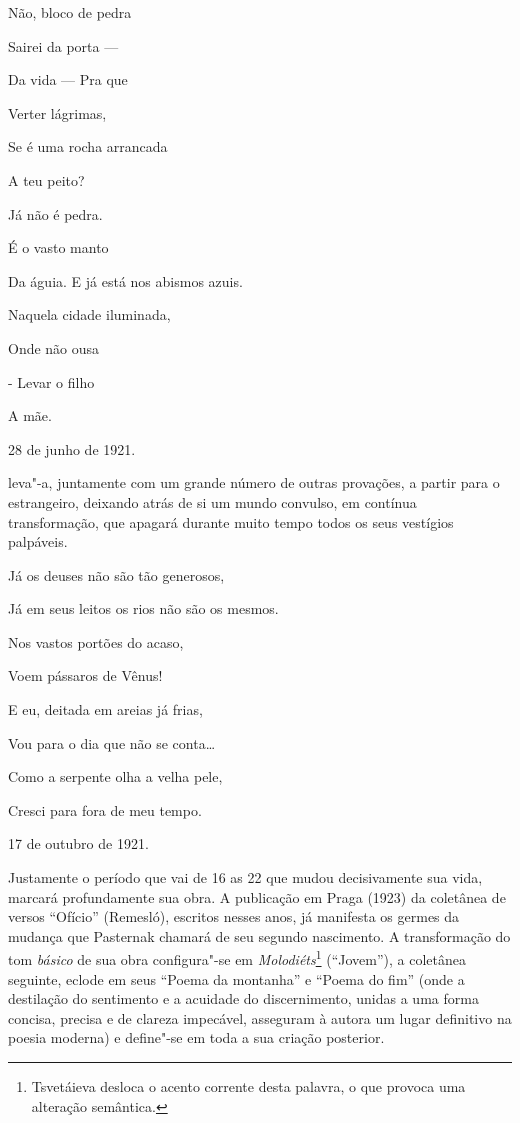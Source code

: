 Não, bloco de pedra

Sairei da porta ---

Da vida --- Pra que

Verter lágrimas,

Se é uma rocha arrancada

A teu peito?

Já não é pedra.

É o vasto manto

Da águia. E já está nos abismos azuis.

Naquela cidade iluminada,

Onde não ousa

- Levar o filho

A mãe.

28 de junho de 1921.

leva"-a, juntamente com um grande número de outras provações, a partir
para o estrangeiro, deixando atrás de si um mundo convulso, em contínua
transformação, que apagará durante muito tempo todos os seus vestígios
palpáveis.

Já os deuses não são tão generosos,

Já em seus leitos os rios não são os mesmos.

Nos vastos portões do acaso,

Voem pássaros de Vênus!

E eu, deitada em areias já frias,

Vou para o dia que não se conta\ldots{}

Como a serpente olha a velha pele,

Cresci para fora de meu tempo.

17 de outubro de 1921.

Justamente o período que vai de 16 as 22 que mudou decisivamente sua
vida, marcará profundamente sua obra. A publicação em Praga (1923) da
coletânea de versos ``Ofício'' (Remesló), escritos nesses anos, já
manifesta os germes da mudança que Pasternak chamará de seu segundo
nascimento. A transformação do tom \emph{básico} de sua obra
configura"-se em \emph{Molodiéts}\footnote{Tsvetáieva desloca o acento
  corrente desta palavra, o que provoca uma alteração semântica.}
(``Jovem''), a coletânea seguinte, eclode em seus ``Poema da montanha''
e ``Poema do fim'' (onde a destilação do sentimento e a acuidade do
discernimento, unidas a uma forma concisa, precisa e de clareza
impecável, asseguram à autora um lugar definitivo na poesia moderna) e
define"-se em toda a sua criação posterior.

